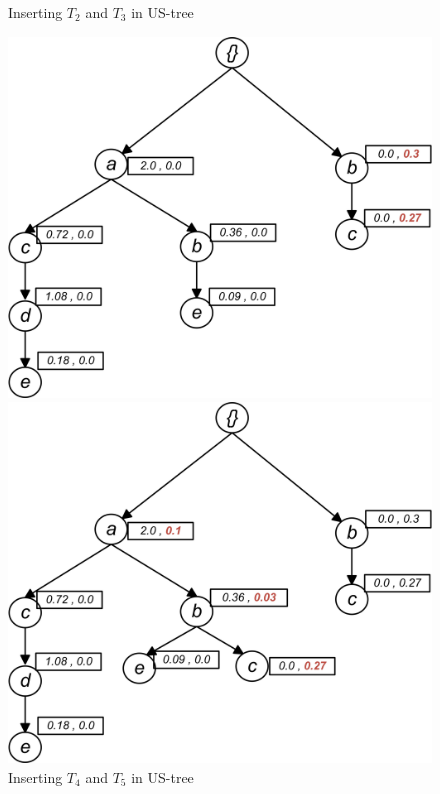 \begin{figure}
\begin{minipage}{0.40\textwidth}
\end{minipage}
 \caption{Inserting $T_2$ and $T_3$ in US-tree}
 \label{figure:t23}
\end{figure}

\begin{figure}
\begin{minipage}{0.50\textwidth}
  \centering
  \includegraphics[width=\textwidth]{images/sim_04.jpg}
\end{minipage}
\hfill
\begin{minipage}{0.50\textwidth}
  \centering
  \includegraphics[width=\textwidth]{images/sim_05.jpg}
\end{minipage}
\caption{Inserting $T_4$ and $T_5$ in US-tree}
 \label{figure:t456}
\end{figure}


